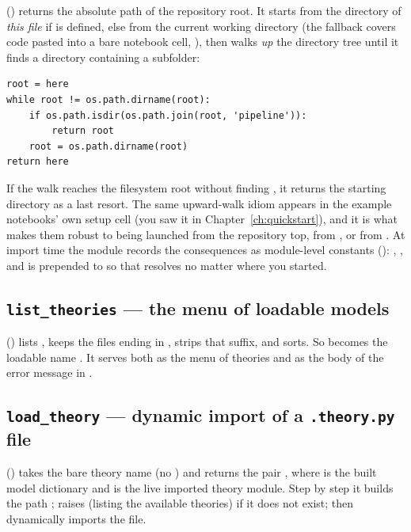  () returns the absolute
path of the repository root. It starts from the directory of \emph{this file} if
 is defined, else from the current working directory (the
fallback covers code pasted into a bare notebook cell,
), then walks \emph{up} the directory tree until
it finds a directory containing a  subfolder:

\begin{lstlisting}
root = here
while root != os.path.dirname(root):
    if os.path.isdir(os.path.join(root, 'pipeline')):
        return root
    root = os.path.dirname(root)
return here
\end{lstlisting}

If the walk reaches the filesystem root without finding , it
returns the starting directory as a last resort. The same upward-walk idiom
appears in the example notebooks' own setup cell (you saw it in
Chapter~\ref{ch:quickstart}), and it is what makes them robust to being launched
from the repository top, from , or from
. At import time the module records the consequences as
module-level constants (): , , and 
is prepended to  so that  resolves no matter
where you started.

\subsection{\texttt{list\_theories} --- the menu of loadable models}

 () lists
, keeps the files ending in , strips that
suffix, and sorts. So  becomes the loadable name
. It serves both as the menu of theories and as the body of the
error message in .

\subsection{\texttt{load\_theory} --- dynamic import of a \texttt{.theory.py} file}

 () takes the bare theory
name (no ) and returns the pair , where
 is the built model dictionary and  is
the live imported theory module. Step by step it builds the path
; raises  (listing
the available theories) if it does not exist; then dynamically imports the file.

